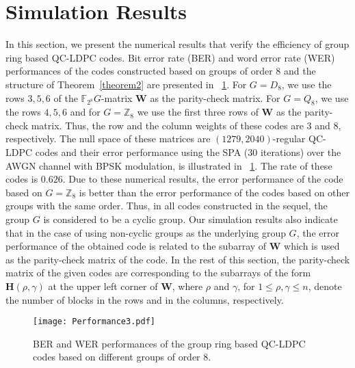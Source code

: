\documentclass[journal,draftclsnofoot,onecolumn,12pt,twoside]{IEEEtran}
\begin{document}
\section{Simulation Results}\label{simulation}
In this section, we present the numerical results that verify the efficiency of  group ring based QC-LDPC codes.   Bit error rate (BER) and word error rate (WER) performances of the  codes constructed based on groups of order $8$ and the structure of Theorem~\ref{theorem2} are presented in \figurename~\ref{figsim3}. For $G=D_8$, we use the rows $3,5,6$ of the $\mathbb{F}_{2^8}G$-matrix $\mathbf{W}$ as the parity-check matrix. For $G=Q_8$, we use the rows $4,5,6$ and for $G=\mathbb{Z}_8$ we use the first three rows of $\mathbf{W}$ as the parity-check matrix. Thus, the row and the column weights of these codes are $3$ and $8$, respectively. The null space of these matrices  are  $(1279,2040)$-regular QC-LDPC codes and their error performance using the SPA ($30$ iterations) over the AWGN channel with BPSK modulation, is illustrated in \figurename~\ref{figsim3}. The rate of these codes is $0.626$. Due to these numerical results, the error performance of the code based on $G=\mathbb{Z}_8$ is better than the error performance of the codes based on other groups with the same order. Thus, in  all  codes constructed  in the sequel, the group $G$ is considered to be a cyclic group.
Our simulation results also indicate that in the case of using non-cyclic groups as the underlying group $G$, the error performance of the obtained code is related to the subarray of $\mathbf{W}$ which is used as the parity-check matrix of the code. In the rest of this section, the parity-check matrix of the given codes are corresponding to the subarrays of the form $\mathbf{H}(\rho,\gamma)$ at the upper left corner of $\mathbf{W}$, where $\rho$ and $\gamma$, for $1\leq\rho,\gamma\leq n$, denote the number of blocks in the rows and in the columns, respectively.
\begin{figure}[!h]
\centering
\texttt{[image: Performance3.pdf]}
\caption{BER and WER performances of the group ring based QC-LDPC codes based on different groups of order $8$.}
\label{figsim3}
\end{figure}
\end{document}
